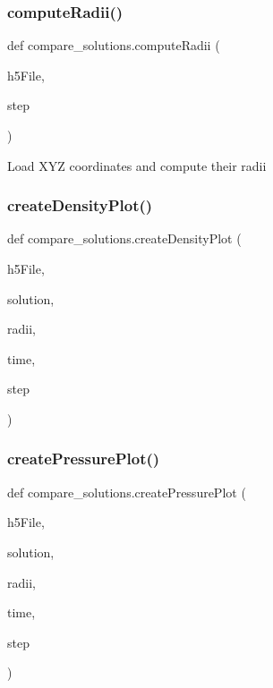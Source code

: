 \mbox{\label{namespacecompare__solutions_a8b926f5606b575b076a639234b9f3cf8}} 
\subsubsection{\texorpdfstring{compute\+Radii()}{computeRadii()}}
{\footnotesize\ttfamily def compare\+\_\+solutions.\+compute\+Radii (\begin{DoxyParamCaption}\item[{}]{h5\+File,  }\item[{}]{step }\end{DoxyParamCaption})}

\begin{DoxyVerb}Load XYZ coordinates and compute their radii \end{DoxyVerb}
 \mbox{\label{namespacecompare__solutions_ac3678ff71eb43d33b89ce711631e45e7}} 
\subsubsection{\texorpdfstring{create\+Density\+Plot()}{createDensityPlot()}}
{\footnotesize\ttfamily def compare\+\_\+solutions.\+create\+Density\+Plot (\begin{DoxyParamCaption}\item[{}]{h5\+File,  }\item[{}]{solution,  }\item[{}]{radii,  }\item[{}]{time,  }\item[{}]{step }\end{DoxyParamCaption})}

\mbox{\label{namespacecompare__solutions_a0a849b6feb2639d7ae7ff62bf9239c97}} 
\subsubsection{\texorpdfstring{create\+Pressure\+Plot()}{createPressurePlot()}}
{\footnotesize\ttfamily def compare\+\_\+solutions.\+create\+Pressure\+Plot (\begin{DoxyParamCaption}\item[{}]{h5\+File,  }\item[{}]{solution,  }\item[{}]{radii,  }\item[{}]{time,  }\item[{}]{step }\end{DoxyParamCaption})}

